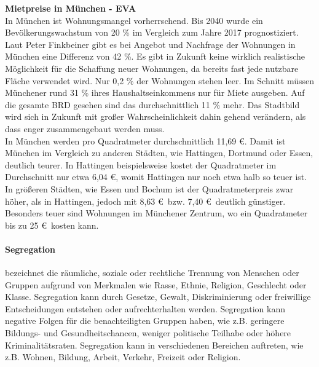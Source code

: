 \documentclass[12pt,a4paper]{report}
\begin{document}
	\noindent
	\Large
	\textbf{Mietpreise in München - EVA}
	\\[1cm]
	\large
	In München ist Wohnungsmangel vorherrschend.
	Bis 2040 wurde ein Bevölkerungswachstum von 20 \% im Vergleich zum Jahre 2017 prognostiziert.
	Laut Peter Finkbeiner gibt es bei Angebot und Nachfrage der Wohnungen in München eine Differenz von 42 \%.
	Es gibt in Zukunft keine wirklich realistische Möglichkeit für die Schaffung neuer Wohnungen, da bereits fast jede nutzbare Fläche verwendet wird.
	Nur 0,2 \% der Wohnungen stehen leer.
	Im Schnitt müssen Münchener rund 31 \% ihres Haushaltseinkommens nur für Miete ausgeben.
	Auf die gesamte BRD gesehen sind das durchschnittlich 11 \% mehr.
	Das Stadtbild wird sich in Zukunft mit großer Wahrscheinlichkeit dahin gehend verändern, als dass enger zusammengebaut werden muss.
	\\
	In München werden pro Quadratmeter durchschnittlich 11,69 \euro.
	Damit ist München im Vergleich zu anderen Städten, wie Hattingen, Dortmund oder Essen, deutlich teurer.
	In Hattingen beispielsweise kostet der Quadratmeter im Durchschnitt nur etwa 6,04 \euro, womit Hattingen nur noch etwa halb so teuer ist.
	In größeren Städten, wie Essen und Bochum ist der Quadratmeterpreis zwar höher, als in Hattingen, jedoch mit 8,63 \euro\ bzw. 7,40 \euro\ deutlich günstiger.
	Besonders teuer sind Wohnungen im Münchener Zentrum, wo ein Quadratmeter bis zu 25 \euro\ kosten kann.
	\paragraph{Segregation} bezeichnet die räumliche, soziale oder rechtliche Trennung von Menschen oder Gruppen aufgrund von Merkmalen wie Rasse, Ethnie, Religion, Geschlecht oder Klasse.
	Segregation kann durch Gesetze, Gewalt, Diskriminierung oder freiwillige Entscheidungen entstehen oder aufrechterhalten werden. Segregation kann negative Folgen für die benachteiligten Gruppen haben, wie z.B. geringere Bildungs- und Gesundheitschancen, weniger politische Teilhabe oder höhere Kriminalitätsraten.
	Segregation kann in verschiedenen Bereichen auftreten, wie z.B. Wohnen, Bildung, Arbeit, Verkehr, Freizeit oder Religion.
\end{document}
